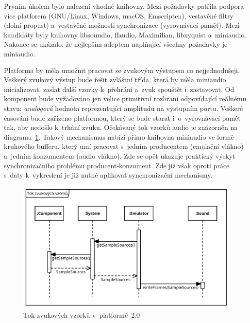 Prvním úkolem bylo nalezení vhodné knihovny. Mezi požadavky patřila podpora více platforem (GNU/Linux, Windows, macOS, Emscripten), vestavěné filtry (dolní propust) a~vestavěné možnosti synchronizace (vyrovnávací paměť). Mezi kandidáty byly knihovny libsoundio, ffaudio, Maximilian, libnyquist a~miniaudio. Nakonec se ukázalo, že nejlepším adeptem naplňující všechny požadavky je miniaudio.

Platforma by měla umožnit pracovat se zvukovým výstupem co nejjednodušeji. Veškerý zvukový výstup bude řešit zvláštní třída, která by měla miniaudio inicializovat, zaslat další vzorky k~přehrání a~zvuk spouštět i~zastavovat. Od komponent bude vyžadováno jen velice primitivní rozhraní odpovídající reálnému stavu: \emph{analogová} hodnota reprezentující amplitudu na výstupním portu. Veškeré časování bude zařízeno platformou, který se bude starat i~o~vyrovnávací paměť tak, aby nedošlo k~trhání zvuku. Očekávaný tok vzorků audio je znázorněn na diagramu~\ref{fig:navrh-audio-tok}. Takový mechanismus nabízí přímo knihovna miniaudio ve formě kruhového bufferu, který umí pracovat s~jedním producentem (emulační vlákno) a~jedním konzumentem (audio vlákno). Zde se opět ukazuje praktický výskyt synchronizačního problému producent-konzument. Zde již však oproti práce s~daty k~vykreslení je již nutné aplikovat synchronizační mechanismy.

\begin{figure}[ht!]
	\centering
	\caption{Tok zvukových vzorků v~platformě~2.0}\label{fig:navrh-audio-tok}
	\includegraphics[width=1.0\textwidth]{images/tok_vzorku.pdf}
\end{figure}

